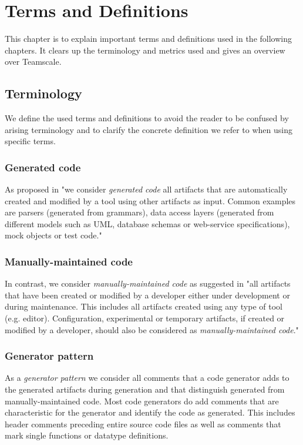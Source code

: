 
\chapter{Terms and Definitions}\label{chapter:terms}
This chapter is to explain important terms and definitions used in the following chapters. It clears up the terminology and metrics used and gives an overview over Teamscale.
\section{Terminology}
We define the used terms and definitions to avoid the reader to be confused by arising terminology and to clarify the concrete definition we refer to when using specific terms.
\subsection{Generated code}
As proposed in \cite{Alves2011} "we consider \textit{generated code} all artifacts that are automatically created and modified by a tool using other artifacts as input. Common examples are parsers (generated from grammars), data access layers (generated from different models such as UML, database schemas or web-service specifications), mock objects or test code."\mbox{\cite[p.~11]{Alves2011}}

\subsection{Manually-maintained code}
In contrast, we consider \textit{manually-maintained code} as suggested in \cite{Alves2011} "all artifacts that have been created or modified by a developer either under development or during maintenance. This includes all artifacts created using any type of tool (e.g. editor). Configuration, experimental or temporary artifacts, if created or modified by a developer, should also be considered as \textit{manually-maintained code}."\mbox{\cite[p.~11]{Alves2011}}

\subsection{Generator pattern}
As a \textit{generator pattern} we consider all comments that a code generator adds to the generated artifacts during generation and that distinguish generated from manually-maintained code. Most code generators do add comments that are characteristic for the generator and identify the code as generated. This includes header comments preceding entire source code files as well as comments that mark single functions or datatype definitions.

